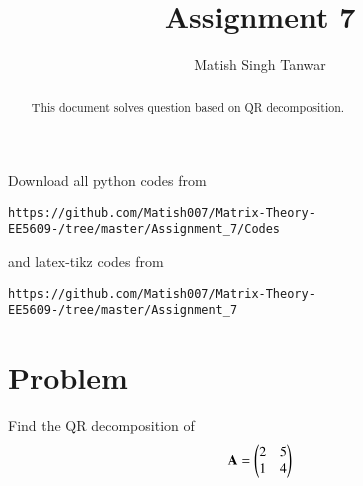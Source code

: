\documentclass[journal,12pt,twocolumn]{IEEEtran}
\begin{document}
 \vspace{3cm}
 \title{Assignment 7}
 \author{Matish Singh Tanwar}
 \maketitle
 \newpage
 \bigskip
 \renewcommand{\thetable}{\theenumi}
\vspace{1.0cm}
\begin{abstract}
This document solves question based on QR decomposition.
\end{abstract}
\vspace{0.5cm}
%
Download all python codes from 
\begin{lstlisting}
https://github.com/Matish007/Matrix-Theory-EE5609-/tree/master/Assignment_7/Codes
\end{lstlisting}
%
and latex-tikz codes from 
\begin{lstlisting}
https://github.com/Matish007/Matrix-Theory-EE5609-/tree/master/Assignment_7
\end{lstlisting}
%
%
\vspace{0.5mm}
\section{Problem}
Find the QR decomposition of 
\begin{align}
\mathbf{A}=\begin{pmatrix}2&5\\1&4\end{pmatrix} \label{1}
\end{align}
\end{document}
